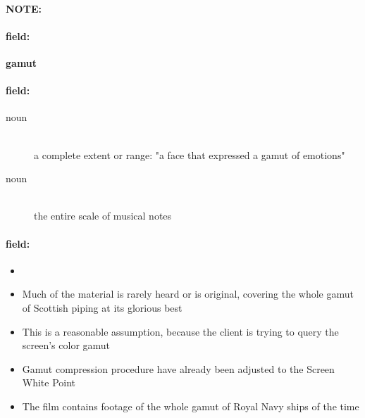 \documentclass[12pt]{article}
\newenvironment{note}{\paragraph{NOTE:}}{}
\newenvironment{field}{\paragraph{field:}}{}
\begin{document}
\begin{note}
\begin{field}
\textbf{\large gamut}
\end{field}


\begin{field}
\begin{description}
\item[noun] \hfill \\ 
a complete extent or range: "a face that expressed a gamut of emotions"

\item[noun] \hfill \\ 
the entire scale of musical notes

\end{description}
\end{field}

\begin{field}
\begin{itemize}
\item 
\item Much of the material is rarely heard or is original, covering the whole gamut of Scottish piping at its glorious best
\item This is a reasonable assumption, because the client is trying to query the screen's color gamut
\item Gamut compression procedure have already been adjusted to the Screen White Point
\item The film contains footage of the whole gamut of Royal Navy ships of the time
\end{itemize}
\end{field}
\end{note}
\end{document}
